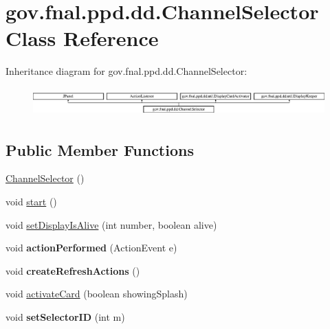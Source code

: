 \hypertarget{classgov_1_1fnal_1_1ppd_1_1dd_1_1ChannelSelector}{\section{gov.\-fnal.\-ppd.\-dd.\-Channel\-Selector Class Reference}
\label{classgov_1_1fnal_1_1ppd_1_1dd_1_1ChannelSelector}
}
Inheritance diagram for gov.\-fnal.\-ppd.\-dd.\-Channel\-Selector\-:\begin{figure}[H]
\begin{center}
\leavevmode
\includegraphics[height=1.102362cm]{classgov_1_1fnal_1_1ppd_1_1dd_1_1ChannelSelector}
\end{center}
\end{figure}
\subsection*{Public Member Functions}
\begin{DoxyCompactItemize}
\item 
\hyperlink{classgov_1_1fnal_1_1ppd_1_1dd_1_1ChannelSelector_a95df49bb45dc325360d7af8ef4a4da22}{Channel\-Selector} ()
\item 
void \hyperlink{classgov_1_1fnal_1_1ppd_1_1dd_1_1ChannelSelector_a9df07ecad4e75132a866bc81169e0df6}{start} ()
\item 
void \hyperlink{classgov_1_1fnal_1_1ppd_1_1dd_1_1ChannelSelector_ab92bc1ecd4b25b8a2a1fed26b57d4d57}{set\-Display\-Is\-Alive} (int number, boolean alive)
\item 
\hypertarget{classgov_1_1fnal_1_1ppd_1_1dd_1_1ChannelSelector_a58d155d92e2b6f64d228cadc3b1039e9}{void {\bfseries action\-Performed} (Action\-Event e)}\label{classgov_1_1fnal_1_1ppd_1_1dd_1_1ChannelSelector_a58d155d92e2b6f64d228cadc3b1039e9}

\item 
\hypertarget{classgov_1_1fnal_1_1ppd_1_1dd_1_1ChannelSelector_a23fbec08667c8708a2a9833005e1edec}{void {\bfseries create\-Refresh\-Actions} ()}\label{classgov_1_1fnal_1_1ppd_1_1dd_1_1ChannelSelector_a23fbec08667c8708a2a9833005e1edec}

\item 
void \hyperlink{classgov_1_1fnal_1_1ppd_1_1dd_1_1ChannelSelector_a637dbc852a236c96841cd5d5492a1079}{activate\-Card} (boolean showing\-Splash)
\item 
\hypertarget{classgov_1_1fnal_1_1ppd_1_1dd_1_1ChannelSelector_a930233587284af74e0533faffc368804}{void {\bfseries set\-Selector\-I\-D} (int m)}\label{classgov_1_1fnal_1_1ppd_1_1dd_1_1ChannelSelector_a930233587284af74e0533faffc368804}

\end{DoxyCompactItemize}
